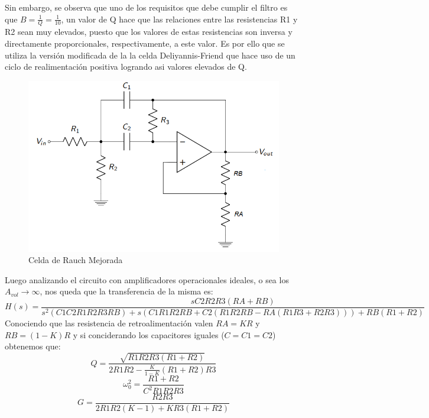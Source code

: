 Sin embargo, se observa que uno de los requisitos que debe cumplir el filtro es que $B = \frac{1}{Q} = \frac{1}{10}$, un valor de Q hace que las relaciones entre las resistencias R1 y R2 sean muy elevados, puesto que los valores de estas resistencias son inversa y directamente proporcionales, respectivamente, a este valor. Es por ello que se utiliza la versión modificada de la la celda Deliyannis-Friend que hace uso de un ciclo de realimentación positiva logrando asi valores elevados de Q.

\begin{figure}[H]
    \centering
    \includegraphics[scale = 0.6]{circuito.png}
    \caption{Celda de Rauch Mejorada}
    \label{ej22cirbasic}
\end{figure}

Luego analizando el circuito con amplificadores operacionales ideales, o sea los $A_{vol} \longrightarrow \infty$, nos queda que la transferencia de la misma es:
\begin{equation}
    \label{ej22eqh}
    H(s) = \frac{sC2R2R3(RA+RB)}{s^2(C1C2R1R2R3RB) + s(C1R1R2RB + C2(R1R2RB - RA(R1R3 + R2R3))) + RB(R1+R2)}
\end{equation}
Conociendo que las resistencia de retroalimentación valen $RA = KR$ y $RB = (1-K)R$ y si conciderando los capacitores iguales ($C = C1 = C2$) obtenemos que:
\begin{equation}
    \label{ej22eqq}
    Q = \frac{\sqrt{R1R2R3(R1 + R2)}}{2R1R2 - \frac{K}{1 -K} (R1 + R2)R3}
\end{equation}
\begin{equation}
    \label{ej22eqw0}
    \omega_0^2 = \frac{R1+R2}{C^2R1R2R3}
\end{equation}
\begin{equation}
    \label{ej22eqg}
    G = \frac{R2R3}{2R1R2(K - 1) + KR3(R1 + R2)}
\end{equation}

